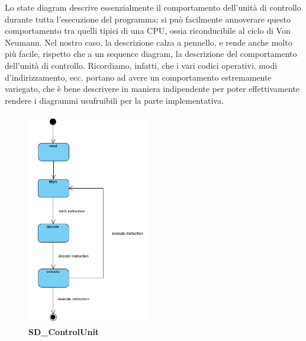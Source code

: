 \documentclass[11pt]{article}
\begin{document}
Lo state diagram descrive essenzialmente il comportamento dell'unità di controllo durante tutta l'esecuzione del programma; si può facilmente annoverare questo comportamento tra quelli tipici di una CPU, ossia riconducibile al ciclo di Von Neumann. Nel nostro caso, la descrizione calza a pennello, e rende anche molto più facile, rispetto che a un sequence diagram, la descrizione del comportamento dell'unità di controllo. Ricordiamo, infatti, che i vari codici operativi, modi d'indirizzamento, ecc. portano ad avere un comportamento estremamente variegato, che è bene descrivere in maniera indipendente per poter effettivamente rendere i diagrammi usufruibili per la parte implementativa. 
\clearpage
\begin{figure}[h]
\centering
\includegraphics[width=200px, height=352px]{SD_ControlUnit.png}\\
\small\textbf{SD\_ControlUnit}
\end{figure}
\end{document}

